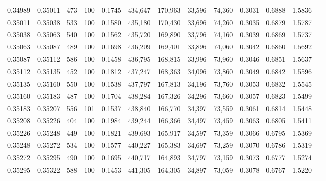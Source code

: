 \begin{tabular}{rrrrrrrrrrrrr}
0.34989 & 0.35011 &    473 & 100 &                                     0.1745 & 434,647 & 170,963 &  33,596 &  74,360 & 0.3031 & 0.6888 & 1.5836 \\
0.35011 & 0.35038 &    533 & 100 &                                     0.1580 & 435,180 & 170,430 &  33,696 &  74,260 & 0.3035 & 0.6879 & 1.5787 \\
0.35038 & 0.35063 &    540 & 100 &                                     0.1562 & 435,720 & 169,890 &  33,796 &  74,160 & 0.3039 & 0.6869 & 1.5737 \\
0.35063 & 0.35087 &    489 & 100 &                                     0.1698 & 436,209 & 169,401 &  33,896 &  74,060 & 0.3042 & 0.6860 & 1.5692 \\
0.35087 & 0.35112 &    586 & 100 &                                     0.1458 & 436,795 & 168,815 &  33,996 &  73,960 & 0.3046 & 0.6851 & 1.5637 \\
0.35112 & 0.35135 &    452 & 100 &                                     0.1812 & 437,247 & 168,363 &  34,096 &  73,860 & 0.3049 & 0.6842 & 1.5596 \\
0.35135 & 0.35160 &    550 & 100 &                                     0.1538 & 437,797 & 167,813 &  34,196 &  73,760 & 0.3053 & 0.6832 & 1.5545 \\
0.35160 & 0.35183 &    487 & 100 &                                     0.1704 & 438,284 & 167,326 &  34,296 &  73,660 & 0.3057 & 0.6823 & 1.5499 \\
0.35183 & 0.35207 &    556 & 101 &                                     0.1537 & 438,840 & 166,770 &  34,397 &  73,559 & 0.3061 & 0.6814 & 1.5448 \\
0.35208 & 0.35226 &    404 & 100 &                                     0.1984 & 439,244 & 166,366 &  34,497 &  73,459 & 0.3063 & 0.6805 & 1.5411 \\
0.35226 & 0.35248 &    449 & 100 &                                     0.1821 & 439,693 & 165,917 &  34,597 &  73,359 & 0.3066 & 0.6795 & 1.5369 \\
0.35248 & 0.35272 &    534 & 100 &                                     0.1577 & 440,227 & 165,383 &  34,697 &  73,259 & 0.3070 & 0.6786 & 1.5319 \\
0.35272 & 0.35295 &    490 & 100 &                                     0.1695 & 440,717 & 164,893 &  34,797 &  73,159 & 0.3073 & 0.6777 & 1.5274 \\
0.35295 & 0.35322 &    588 & 100 &                                     0.1453 & 441,305 & 164,305 &  34,897 &  73,059 & 0.3078 & 0.6767 & 1.5220 \\

\end{tabular}

